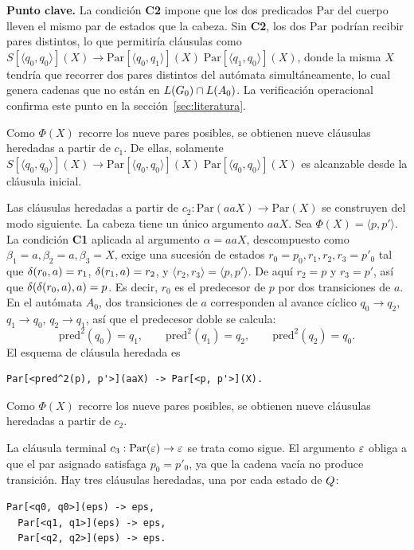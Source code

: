 \begin{tcolorbox}[colback=blue!5!white, colframe=blue!50!black, boxrule=0.5pt, arc=2pt]
\textbf{Punto clave.} La condición \textbf{C2} impone que los dos predicados $\mathrm{Par}$ del cuerpo lleven el mismo par de estados que la cabeza. Sin \textbf{C2}, los dos $\mathrm{Par}$ podrían recibir pares distintos, lo que permitiría cláusulas como $S[\langle q_0, q_0 \rangle](X) \to \mathrm{Par}[\langle q_0, q_1 \rangle](X) \; \mathrm{Par}[\langle q_1, q_0 \rangle](X)$, donde la misma $X$ tendría que recorrer dos pares distintos del autómata simultáneamente, lo cual genera cadenas que no están en $L(G_0) \cap L(A_0)$. La verificación operacional confirma este punto en la sección~\ref{sec:literatura}.
\end{tcolorbox}

Como $\Phi(X)$ recorre los nueve pares posibles, se obtienen nueve cláusulas heredadas a partir de $c_1$. De ellas, solamente $S[\langle q_0, q_0 \rangle](X) \to \mathrm{Par}[\langle q_0, q_0 \rangle](X) \; \mathrm{Par}[\langle q_0, q_0 \rangle](X)$ es alcanzable desde la cláusula inicial.

Las cláusulas heredadas a partir de $c_2 : \mathrm{Par}(aaX) \to \mathrm{Par}(X)$ se construyen del modo siguiente. La cabeza tiene un único argumento $aaX$. Sea $\Phi(X) = \langle p, p' \rangle$. La condición \textbf{C1} aplicada al argumento $\alpha = aaX$, descompuesto como $\beta_1 = a, \beta_2 = a, \beta_3 = X$, exige una sucesión de estados $r_0 = p_0, r_1, r_2, r_3 = p'_0$ tal que $\delta(r_0, a) = r_1$, $\delta(r_1, a) = r_2$, y $\langle r_2, r_3 \rangle = \langle p, p' \rangle$. De aquí $r_2 = p$ y $r_3 = p'$, así que $\delta(\delta(r_0, a), a) = p$. Es decir, $r_0$ es el predecesor de $p$ por dos transiciones de $a$. En el autómata $A_0$, dos transiciones de $a$ corresponden al avance cíclico $q_0 \to q_2$, $q_1 \to q_0$, $q_2 \to q_1$, así que el predecesor doble se calcula:
\[
\text{pred}^2(q_0) = q_1, \qquad \text{pred}^2(q_1) = q_2, \qquad \text{pred}^2(q_2) = q_0.
\]
El esquema de cláusula heredada es
\begin{Verbatim}[xleftmargin=2em]
  Par[<pred^2(p), p'>](aaX) -> Par[<p, p'>](X).
\end{Verbatim}
Como $\Phi(X)$ recorre los nueve pares posibles, se obtienen nueve cláusulas heredadas a partir de $c_2$.

La cláusula terminal $c_3 : \mathrm{Par}(\varepsilon) \to \varepsilon$ se trata como sigue. El argumento $\varepsilon$ obliga a que el par asignado satisfaga $p_0 = p'_0$, ya que la cadena vacía no produce transición. Hay tres cláusulas heredadas, una por cada estado de $Q$:
\begin{Verbatim}[xleftmargin=2em]
  Par[<q0, q0>](eps) -> eps,
  Par[<q1, q1>](eps) -> eps,
  Par[<q2, q2>](eps) -> eps.
\end{Verbatim}


